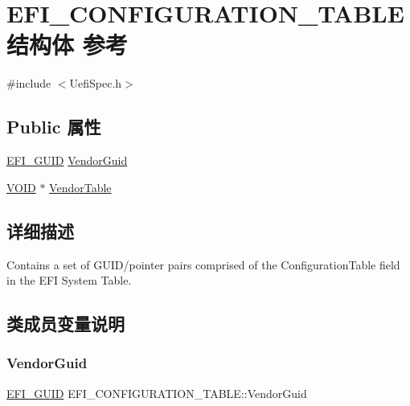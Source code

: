 \hypertarget{struct_e_f_i___c_o_n_f_i_g_u_r_a_t_i_o_n___t_a_b_l_e}{}\section{E\+F\+I\+\_\+\+C\+O\+N\+F\+I\+G\+U\+R\+A\+T\+I\+O\+N\+\_\+\+T\+A\+B\+L\+E结构体 参考}
\label{struct_e_f_i___c_o_n_f_i_g_u_r_a_t_i_o_n___t_a_b_l_e}


{\ttfamily \#include $<$Uefi\+Spec.\+h$>$}

\subsection*{Public 属性}
\begin{DoxyCompactItemize}
\item 
\hyperlink{_uefi_base_type_8h_ad87614428813f71edb2c2d802e9ce2af}{E\+F\+I\+\_\+\+G\+U\+ID} \hyperlink{struct_e_f_i___c_o_n_f_i_g_u_r_a_t_i_o_n___t_a_b_l_e_a50a67cc76cea0a08e7fcfc868ea8a02f}{Vendor\+Guid}
\item 
\hyperlink{interfacevoid}{V\+O\+ID} $\ast$ \hyperlink{struct_e_f_i___c_o_n_f_i_g_u_r_a_t_i_o_n___t_a_b_l_e_a1acfe9c046bb4d3a1e7d0e3c7c06f11b}{Vendor\+Table}
\end{DoxyCompactItemize}


\subsection{详细描述}
Contains a set of G\+U\+I\+D/pointer pairs comprised of the Configuration\+Table field in the E\+FI System Table. 

\subsection{类成员变量说明}
\mbox{\label{struct_e_f_i___c_o_n_f_i_g_u_r_a_t_i_o_n___t_a_b_l_e_a50a67cc76cea0a08e7fcfc868ea8a02f}} 
\subsubsection{\texorpdfstring{Vendor\+Guid}{VendorGuid}}
{\footnotesize\ttfamily \hyperlink{_uefi_base_type_8h_ad87614428813f71edb2c2d802e9ce2af}{E\+F\+I\+\_\+\+G\+U\+ID} E\+F\+I\+\_\+\+C\+O\+N\+F\+I\+G\+U\+R\+A\+T\+I\+O\+N\+\_\+\+T\+A\+B\+L\+E\+::\+Vendor\+Guid}

